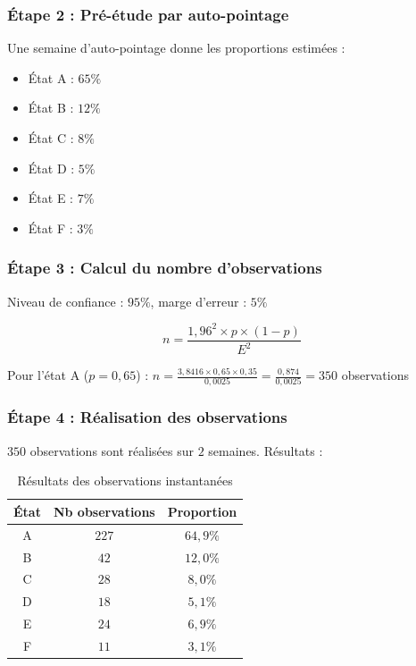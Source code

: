 \documentclass[a4paper,12pt]{article}
\begin{document}
\subsubsection{Étape 2 : Pré-étude par auto-pointage}

Une semaine d'auto-pointage donne les proportions estimées :
\begin{itemize}
    \item État A : $65\%$
    \item État B : $12\%$
    \item État C : $8\%$
    \item État D : $5\%$
    \item État E : $7\%$
    \item État F : $3\%$
\end{itemize}

\subsubsection{Étape 3 : Calcul du nombre d'observations}

Niveau de confiance : $95\%$, marge d'erreur : $5\%$

\[
n = \frac{1,96^2 \times p \times (1-p)}{E^2}
\]

Pour l'état A ($p=0,65$) : $n = \frac{3,8416 \times 0,65 \times 0,35}{0,0025} = \frac{0,874}{0,0025} = 350$ observations

\subsubsection{Étape 4 : Réalisation des observations}

$350$ observations sont réalisées sur $2$ semaines. Résultats :

\begin{table}[ht]
\centering
\begin{tabular}{|c|c|c|}
\hline
\textbf{État} & \textbf{Nb observations} & \textbf{Proportion} \\
\hline
A & $227$ & $64,9\%$ \\
B & $42$ & $12,0\%$ \\
C & $28$ & $8,0\%$ \\
D & $18$ & $5,1\%$ \\
E & $24$ & $6,9\%$ \\
F & $11$ & $3,1\%$ \\
\hline
\end{tabular}
\caption{Résultats des observations instantanées}
\end{table}
\end{document}
